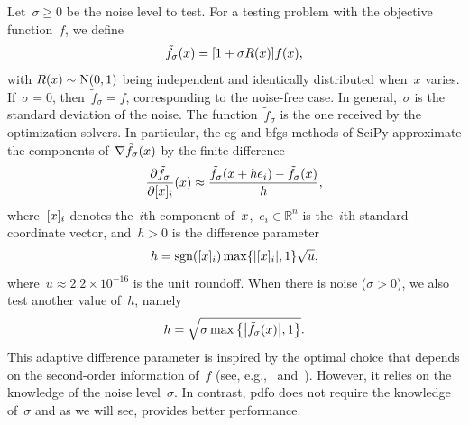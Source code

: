 \documentclass{article}
\numberwithin{equation}{section}
\theoremstyle{definition}
\theoremstyle{plain}
\theoremstyle{remark}
\DeclareMathOperator{\sgn}{sgn}
\newcommand*{\R}{\mathbb{R}}
\newcommand*{\abs}[2][]{#1\lvert#2#1\rvert}
\newcommand*{\set}[2][]{#1\{#2#1\}}
\newcommand{\NN}{\mathrm{N}}
\newcommand{\iter}[1][k]{x\ifthenelse{\equal{#1}{}}{}{_{#1}}}
\newcommand{\obj}{f}
\begin{document}
Let~$\sigma \ge 0$ be the noise level to test.
For a testing problem with the objective function~$\obj$, we define
\begin{equation}
    \label{eq:noisy-obj}
    \tilde{\obj}_\sigma(\iter[]) = [1 + \sigma R(\iter[])] \obj(\iter[]),
\end{equation}
with $R(\iter[])\sim \NN(0, 1)$ being independent and identically distributed when~$x$ varies.
If~$\sigma = 0$, then~$\tilde{f}_\sigma = f$, corresponding to the noise-free case.
In general,~$\sigma$ is the standard deviation of the noise.
The function~$\tilde{\obj}_\sigma$ is the one received by the optimization solvers.
In particular, the \gls{cg} and \gls{bfgs} methods of SciPy approximate the components of~$\nabla \tilde{\obj}_\sigma(\iter[])$ by the finite difference
\begin{equation*}
    \frac{\partial \tilde{\obj}_\sigma}{\partial [{\iter[]}]_i}(\iter[]) \approx \frac{\tilde{\obj}_\sigma(\iter[] + h e_i) - \tilde{\obj}_\sigma(\iter[])}{h},
\end{equation*}
where~$[{\iter[]}]_i$ denotes the~$i$th component of~$\iter[]$,~$e_i \in \R^n$ is the~$i$th standard coordinate vector, and~$h > 0$ is the difference parameter
\begin{equation}
    \label{eq:scipy-h}
    h = \sgn([{\iter[]}]_i) \max \set{\abs{[{\iter[]}]_i}, 1} \sqrt{u},
\end{equation}
where~$u \approx 2.2 \times 10^{-16}$ is the unit roundoff.
When there is noise ($\sigma > 0$), we also test another value of~$h$, namely
\begin{equation}
    \label{eq:adaptive-h}
    h = \sqrt{\sigma \max \set[\big]{\abs[\big]{\tilde{\obj}_\sigma(\iter[])}, 1}}.
\end{equation}
This adaptive difference parameter is inspired by the optimal choice that depends on the second-order information of~$\obj$ (see, e.g.,~\cite{More_Wild_2012} and~\cite[Equation~(2.2)]{Shi_Etal_2022a}).
However, it relies on the knowledge of the noise level~$\sigma$.
In contrast, \gls{pdfo} does not require the knowledge of~$\sigma$ and as we will see, provides better performance.
\end{document}
